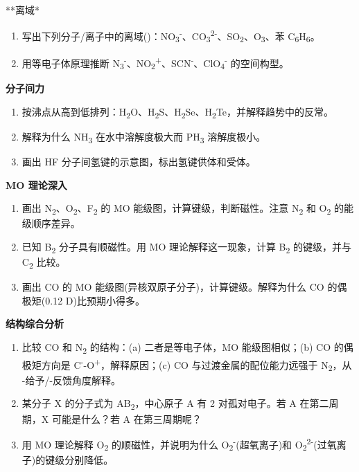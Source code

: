 **离域*

\begin{enumerate}
\def\labelenumi{\arabic{enumi}.}
\setcounter{enumi}{9}
\item
  写出下列分子/离子中的离域()：NO\textsubscript{3}\textsuperscript{-}、CO\textsubscript{3}\textsuperscript{2-}、SO\textsubscript{2}、O\textsubscript{3}、苯 C\textsubscript{6}H\textsubscript{6}。
\item
  用等电子体原理推断 N\textsubscript{3}\textsuperscript{-}、NO\textsubscript{2}\textsuperscript{+}、SCN\textsuperscript{-}、ClO\textsubscript{4}\textsuperscript{-} 的空间构型。
\end{enumerate}

\textbf{分子间力}

\begin{enumerate}
\def\labelenumi{\arabic{enumi}.}
\setcounter{enumi}{11}
\item
  按沸点从高到低排列：H\textsubscript{2}O、H\textsubscript{2}S、H\textsubscript{2}Se、H\textsubscript{2}Te，并解释趋势中的反常。
\item
  解释为什么 NH\textsubscript{3} 在水中溶解度极大而 PH\textsubscript{3} 溶解度极小。
\item
  画出 HF 分子间氢键的示意图，标出氢键供体和受体。
\end{enumerate}

\textbf{MO 理论深入}

\begin{enumerate}
\def\labelenumi{\arabic{enumi}.}
\setcounter{enumi}{14}
\item
  画出 N\textsubscript{2}、O\textsubscript{2}、F\textsubscript{2} 的 MO 能级图，计算键级，判断磁性。注意 N\textsubscript{2} 和 O\textsubscript{2} 的能级顺序差异。
\item
  已知 B\textsubscript{2} 分子具有顺磁性。用 MO 理论解释这一现象，计算 B\textsubscript{2} 的键级，并与 C\textsubscript{2} 比较。
\item
  画出 CO 的 MO 能级图(异核双原子分子)，计算键级。解释为什么 CO 的偶极矩(0.12 D)比预期小得多。
\end{enumerate}

\textbf{结构综合分析}

\begin{enumerate}
\def\labelenumi{\arabic{enumi}.}
\setcounter{enumi}{17}
\item
  比较 CO 和 N\textsubscript{2} 的结构：(a) 二者是等电子体，MO 能级图相似；(b) CO 的偶极矩方向是 C\textsuperscript{-}-O\textsuperscript{+}，解释原因；(c) CO 与过渡金属的配位能力远强于 N\textsubscript{2}，从 -给予/\派-反馈角度解释。
\item
  某分子 X 的分子式为 AB\textsubscript{2}，中心原子 A 有 2 对孤对电子。若 A 在第二周期，X 可能是什么？若 A 在第三周期呢？
\item
  用 MO 理论解释 O\textsubscript{2} 的顺磁性，并说明为什么 O\textsubscript{2}\textsuperscript{-}(超氧离子)和 O\textsubscript{2}\textsuperscript{2-}(过氧离子)的键级分别降低。
\end{enumerate}

